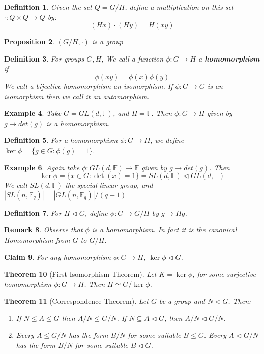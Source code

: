 \documentclass[a4paper,10pt]{article}
\newcommand{\FF}{\mathbb{F}}
\newtheorem{thm}{Theorem}
\newtheorem{Def}[thm]{Definition}
\newtheorem{cl}[thm]{Claim}
\newtheorem{prop}[thm]{Proposition}
\newtheorem{eg}[thm]{Example}
\newtheorem{rem}[thm]{Remark}
\begin{document}
\begin{Def}
Given the set $Q = G / H$, define a multiplication on this set $\cdot : Q \times Q \rightarrow Q$ by:
\[ (Hx) \cdot (Hy) = H(xy) \]
\end{Def}
\begin{prop}
$(G / H, \cdot)$ is a group
\end{prop}
\begin{Def}
For groups $G,H$, We call a function $\phi : G \rightarrow H$ a \textbf{homomorphism} if
\[ \phi(xy) = \phi(x) \phi(y) \]
We call a bijective homomorphism an isomorphism. If $\phi : G \rightarrow G$ is an isomorphism then we call it an automorphism.
\end{Def}
\begin{eg}
Take $G = GL(d, \FF)$, and $H = \FF$. Then $\phi : G \rightarrow H$ given by $g \mapsto det(g)$ is a homomorphism.
\end{eg}
\begin{Def}
For a homomorphism $\phi : G \rightarrow H$, we define $\ker \phi = \{ g \in G : \phi(g) = 1 \}$.
\end{Def}
\begin{eg}
Again take $\phi : GL(d, \FF) \rightarrow \FF$ given by $g \mapsto det(g)$. Then 
\[ \ker \phi = \{ x \in G : \det(x) = 1 \} = SL(d,\FF) \triangleleft GL(d, \FF) \] 
We call $SL(d,\FF)$ the special linear group, and $|SL(n,\FF_q)| = |GL(n,\FF_q) | / (q - 1)$
\end{eg}
\begin{Def}
For $H \triangleleft G$, define $\phi : G \rightarrow G / H$ by $g \mapsto Hg$.
\end{Def}
\begin{rem}
Observe that $\phi$ is a homomorphism. In fact it is the canonical Homomorphism from $G$ to $G / H$. 
\end{rem}
\begin{cl}
For any homomorphism $\phi : G \rightarrow H$, $\ker \phi \triangleleft G$.
\end{cl}
\begin{thm}[First Isomorphism Theorem]
Let $K = \ker \phi$, for some surjective homomorphism $\phi : G \rightarrow H$. Then $H \simeq G / \ker \phi$.
\end{thm}
\begin{thm}[Correspondence Theorem]
Let $G$ be a group and $N \triangleleft G$. Then:
\begin{enumerate}
\item If $N \leq A \leq G$ then $A / N \leq G / N$. If $N \subseteq A \triangleleft G$, then $A / N \triangleleft G / N$.
\item Every $A \leq G / N$ has the form $B / N$ for some suitable $B \leq G$. Every $A \triangleleft G / N$ has the form $B / N$ for some suitable $B \triangleleft G$.
\end{enumerate}
\end{thm}
\end{document}
